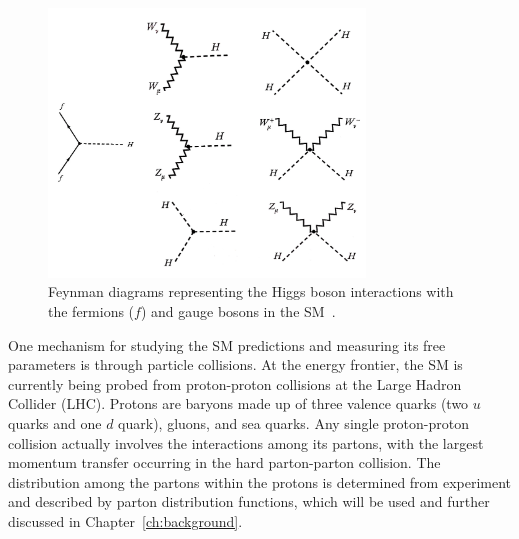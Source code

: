 \begin{figure}[!htb]
	\centering
	\includegraphics[width=0.75\textwidth]{figures/higgs_sm_couplings.png}
	\caption{Feynman diagrams representing the Higgs boson interactions with the fermions ($f$) and gauge bosons in the SM~\cite{Quigg:2013ufa}.}
	\label{fig:higgs_interactions}
\end{figure}

One mechanism for studying the SM predictions and measuring its free parameters is through particle collisions. At the energy frontier, the SM is currently being probed from proton-proton collisions at the Large Hadron Collider (LHC). Protons are baryons made up of three valence quarks (two $u$ quarks and one $d$ quark), gluons, and sea quarks. Any single proton-proton collision actually involves the interactions among its partons, with the largest momentum transfer occurring in the hard parton-parton collision. The distribution among the partons within the protons is determined from experiment and described by parton distribution functions, which will be used and further discussed in Chapter~\ref{ch:background}. 

